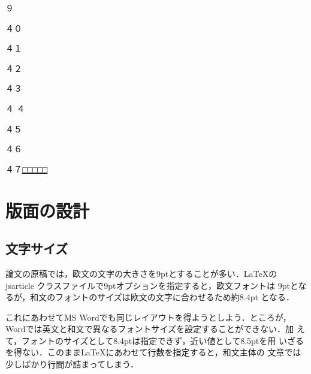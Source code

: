 \documentclass[a4j, 12Q, twocolumn, twoside, draft]{jsarticle}
\begin{document}
９\par \noindent ４０\par
\noindent ４１\par \noindent ４２\par \noindent ４３\par \noindent ４
４\par \noindent ４５\par
\noindent ４６\par \noindent ４７\underline{□□□□□}\par

\section{版面の設計}



\subsection{文字サイズ}

  論文の原稿では，欧文の文字の大きさを9ptとすることが多い．\LaTeX の
  jsarticle クラスファイルで9ptオプションを指定すると，欧文フォントは
  9ptとなるが，和文のフォントのサイズは欧文の文字に合わせるため約8.4pt
  となる．

  これにあわせてMS Wordでも同じレイアウトを得ようとしよう．ところが，
  Wordでは英文と和文で異なるフォントサイズを設定することができない．加
  えて，フォントのサイズとして8.4ptは指定できず，近い値として8.5ptを用
  いざるを得ない．このまま\LaTeX にあわせて行数を指定すると，和文主体の
  文章では少しばかり行間が詰まってしまう．
\end{document}
